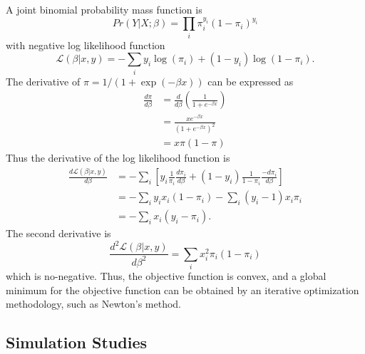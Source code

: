\documentclass{article}
\begin{document}
A joint binomial probability mass function is 
$$Pr(Y|X;\beta) = \prod_i \pi_i^{y_i}\left(1-\pi_i\right)^{y_i}$$ with negative log likelihood function
$$\mathcal{L}\left(\beta|x, y\right) = -\sum_i y_i\log(\pi_i) + \left(1-y_i\right)\log\left(1-\pi_i\right).$$ 
The derivative of $\pi = 1/(1+\exp(-\beta x))$ can be expressed as 
\begin{align*}
\frac{d\pi}{d\beta} &= \frac{d}{d\beta}\left(\frac{1}{1+e^{-\beta x}}\right) \\
&=\frac{xe^{-\beta x}}{\left(1+e^{-\beta x}\right)^2}\\
&=x\pi(1-\pi)
\end{align*}
Thus the derivative of the log likelihood function is 
\begin{align*}
\frac{d\mathcal{L}\left(\beta|x, y\right)}{d\beta} &= -\sum_i \left[y_i\frac{1}{\pi_i}\frac{d\pi_i}{d\beta} + \left(1-y_i\right)\frac{1}{1-\pi_i}\frac{-d\pi_i}{d\beta}\right] \\
&= -\sum_i y_ix_i\left(1-\pi_i\right) - \sum_i\left(y_i-1\right)x_i\pi_i\\
&=-\sum_i x_i\left(y_i-\pi_i\right).
\end{align*} 
The second derivative is
$$\frac{d^2\mathcal{L}\left(\beta|x, y\right)}{d\beta^2} = \sum_i x_i^2\pi_i\left(1-\pi_i\right)$$ which is no-negative. Thus, the objective function is convex, and a global minimum for the objective function can be obtained by an iterative optimization methodology, such as Newton's method. 



\subsection*{Simulation Studies}
\end{document}
